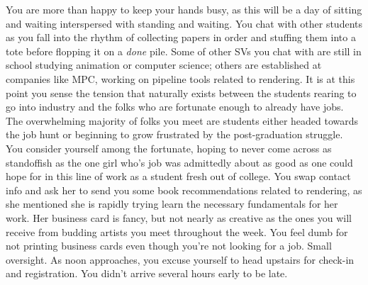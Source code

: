 \documentclass[../main.tex]{subfiles}
\begin{document}
You are more than happy to keep your hands busy, as this will be a day of sitting and waiting interspersed with standing and waiting. You chat with other students as you fall into the rhythm of collecting papers in order and stuffing them into a tote before flopping it on a \textit{done} pile. Some of other SVs you chat with are still in school studying animation or computer science; others are established at companies like MPC, working on pipeline tools related to rendering. It is at this point you sense the tension that naturally exists between the students rearing to go into industry and the folks who are fortunate enough to already have jobs. The overwhelming majority of folks you meet are students either headed towards the job hunt or beginning to grow frustrated by the post-graduation struggle. You consider yourself among the fortunate, hoping to never come across as standoffish as the one girl who's job was admittedly about as good as one could hope for in this line of work as a student fresh out of college. You swap contact info and ask her to send you some book recommendations related to rendering, as she mentioned she is rapidly trying learn the necessary fundamentals for her work. Her business card is fancy, but not nearly as creative as the ones you will receive from budding artists you meet throughout the week. You feel dumb for not printing business cards even though you're not looking for a job. Small oversight. As noon approaches, you excuse yourself to head upstairs for check-in and registration. You didn't arrive several hours early to be late.
\end{document}
